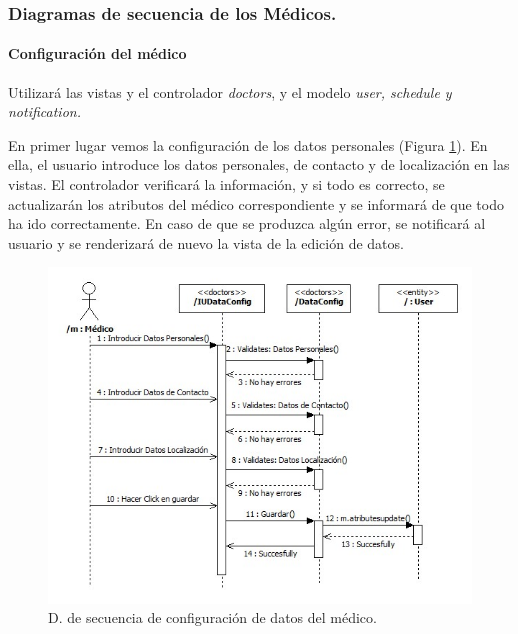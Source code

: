 			
			
			\subsubsection{Diagramas de secuencia de los Médicos.} %
			\label{par:diagramas_de_secuencia_de_los_medicos_}
			
				\paragraph{Configuración del médico} %
				\label{subp:cont_configuracion_doc}
				
					Utilizará las vistas y el controlador \textit{doctors}, y el modelo \textit{user, schedule y notification.}
					
					En primer lugar vemos la configuración de los datos personales (Figura \ref{fig:cont_doc_config_data}). En ella, el usuario introduce los datos personales, de contacto y de localización en las vistas. El controlador verificará la información, y si todo es correcto, se actualizarán los atributos del médico correspondiente y se informará de que todo ha ido correctamente. En caso de que se produzca algún error, se notificará al usuario y se renderizará de nuevo la vista de la edición de datos.
					
					\begin{figure}[H]
					  \centering
					    \includegraphics[width=14cm]{img/jpg/secuencia/1_doc_config_data.jpg}
					  \caption{D. de secuencia de configuración de datos del médico.}
					  \label{fig:cont_doc_config_data}
					\end{figure}
					
